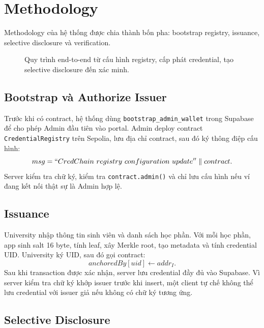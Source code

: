 \section{Methodology}

Methodology của hệ thống được chia thành bốn pha: bootstrap registry, issuance, selective disclosure và verification.

\begin{figure}[t]
  \centering
  
  \caption{Quy trình end-to-end từ cấu hình registry, cấp phát credential, tạo selective disclosure đến xác minh.}
  \label{fig:methodology}
\end{figure}

\subsection{Bootstrap và Authorize Issuer}

Trước khi có contract, hệ thống dùng \texttt{bootstrap\_admin\_wallet} trong Supabase để cho phép Admin đầu tiên vào portal. Admin deploy contract \texttt{CredentialRegistry} trên Sepolia, lưu địa chỉ contract, sau đó ký thông điệp cấu hình:
\begin{equation}
  msg = ``CredChain\ registry\ configuration\ update'' \parallel contract.
\end{equation}
Server kiểm tra chữ ký, kiểm tra \texttt{contract.admin()} và chỉ lưu cấu hình nếu ví đang kết nối thật sự là Admin hợp lệ.

\subsection{Issuance}

University nhập thông tin sinh viên và danh sách học phần. Với mỗi học phần, app sinh salt 16 byte, tính leaf, xây Merkle root, tạo metadata và tính credential UID. University ký UID, sau đó gọi contract:
\begin{equation}
  anchoredBy[uid] \leftarrow addr_I.
\end{equation}
Sau khi transaction được xác nhận, server lưu credential đầy đủ vào Supabase. Vì server kiểm tra chữ ký khớp issuer trước khi insert, một client tự chế không thể lưu credential với issuer giả nếu không có chữ ký tương ứng.

\subsection{Selective Disclosure}

